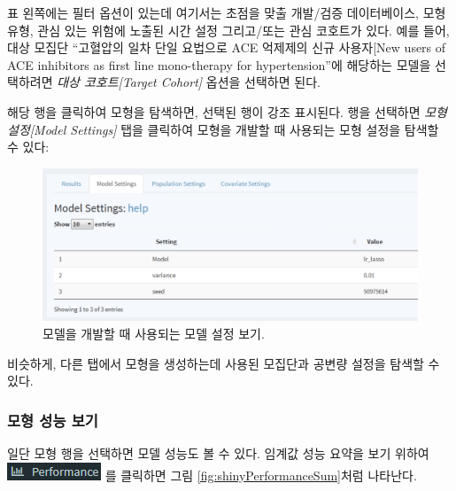 \documentclass[11pt]{book}
\theoremstyle{definition}
\theoremstyle{definition}
\theoremstyle{definition}
\theoremstyle{remark}
\begin{document}
표 왼쪽에는 필터 옵션이 있는데 여기서는 초점을 맞출 개발/검증
데이터베이스, 모형 유형, 관심 있는 위험에 노출된 시간 설정 그리고/또는
관심 코호트가 있다. 예를 들어, 대상 모집단 ``고혈압의 일차 단일 요법으로
ACE 억제제의 신규 사용자{[}New users of ACE inhibitors as first line
mono-therapy for hypertension''에 해당하는 모델을 선택하려면 \emph{대상
코호트{[}Target Cohort{]}} 옵션을 선택하면 된다.

해당 행을 클릭하여 모형을 탐색하면, 선택된 행이 강조 표시된다. 행을
선택하면 \emph{모형 설정{[}Model Settings{]}} 탭을 클릭하여 모형을
개발할 때 사용되는 모형 설정을 탐색할 수 있다:

\begin{figure}

{\centering \includegraphics[width=1\linewidth]{images/PatientLevelPrediction/shiny/shinyModel} 

}

\caption{모델을 개발할 때 사용되는 모델 설정 보기.}\label{fig:shinyModel}
\end{figure}

비슷하게, 다른 탭에서 모형을 생성하는데 사용된 모집단과 공변량 설정을
탐색할 수 있다.

\subsubsection*{모형 성능 보기}\label{--}

일단 모형 행을 선택하면 모델 성능도 볼 수 있다. 임계값 성능 요약을 보기
위하여 \includegraphics{images/PatientLevelPrediction/performance.png}
를 클릭하면 그림 \ref{fig:shinyPerformanceSum}처럼 나타난다.
\end{document}
